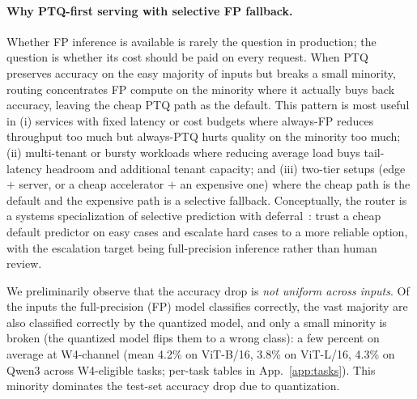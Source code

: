 \documentclass{article}
\newcommand{\fp}{\textsc{FP}\xspace}
\newcommand{\ptq}{\textsc{PTQ}\xspace}
\begin{document}
\paragraph{Why \ptq{}-first serving with selective \fp{} fallback.}
Whether \fp{} inference is available is rarely the question in production; the question is whether its cost should be paid on every request. When \ptq{} preserves accuracy on the easy majority of inputs but breaks a small minority, routing concentrates \fp{} compute on the minority where it actually buys back accuracy, leaving the cheap \ptq{} path as the default. This pattern is most useful in (i) services with fixed latency or cost budgets where always-\fp{} reduces throughput too much but always-\ptq{} hurts quality on the minority too much; (ii) multi-tenant or bursty workloads where reducing average load buys tail-latency headroom and additional tenant capacity; and (iii) two-tier setups (edge $+$ server, or a cheap accelerator $+$ an expensive one) where the cheap path is the default and the expensive path is a selective fallback. Conceptually, the router is a systems specialization of selective prediction with deferral~\cite{geifman2017selective}: trust a cheap default predictor on easy cases and escalate hard cases to a more reliable option, with the escalation target being full-precision inference rather than human review.

We preliminarily observe that the accuracy drop is \emph{not uniform across inputs}. Of the inputs the full-precision (\fp) model classifies correctly, the vast majority are also classified correctly by the quantized model, and only a small minority is broken (the quantized model flips them to a wrong class): a few percent on average at W4-channel (mean 4.2\% on ViT-B/16, 3.8\% on ViT-L/16, 4.3\% on Qwen3 across W4-eligible tasks; per-task tables in App.~\ref{app:tasks}). This minority dominates the test-set accuracy drop due to quantization. 
\end{document}
